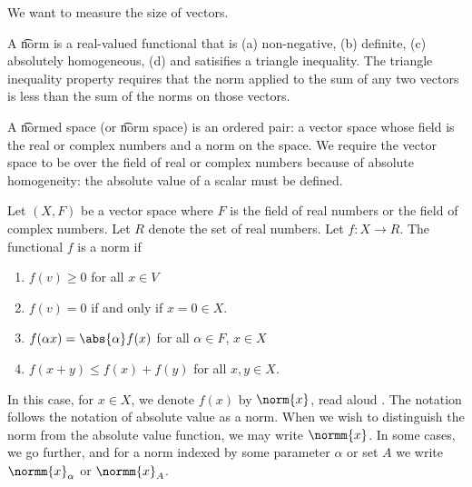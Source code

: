 

We want to measure the size of vectors.


A \t{norm} is a real-valued functional that is
(a) non-negative,
(b) definite,
(c) absolutely homogeneous,
(d) and satisifies a triangle inequality.
The triangle inequality property requires that the norm applied to the sum of any two vectors is less than the sum of the norms on those vectors.

A \t{normed space} (or \t{norm space}) is an ordered pair: a vector space whose field is the real or complex numbers and a norm on the space.
We require the vector space to be over the field of real or complex numbers because of absolute homogeneity: the absolute value of a scalar must be defined.


Let $(X, F)$ be a vector space where $F$ is the field of real numbers or the field of complex numbers.
Let $R$ denote the set of real numbers.
Let $f: X \to R$.
The functional $f$ is a norm if
\begin{enumerate}
  \item $f(v) \geq 0$ for all $x \in V$
  \item $f(v) = 0$ if and only if $x = 0 \in X$.
  \item $f(\alpha x) = \abs{\alpha}f(x)$ for all $\alpha \in F$, $x \in X$
  \item $f(x + y) \leq f(x) + f(y)$ for all $x, y \in X$.
\end{enumerate}

In this case, for $x \in X$,
we denote $f(x)$ by $\norm{x}$,
read aloud .
The notation follows the notation
of absolute value as a norm.
When we wish to distinguish
the norm from the absolute
value function, we may write
$\normm{x}$. In some cases,
we go further, and for a norm
indexed by some parameter $\alpha$
or set $A$ we write $\normm{x}_\alpha$
or $\normm{x}_A$.
